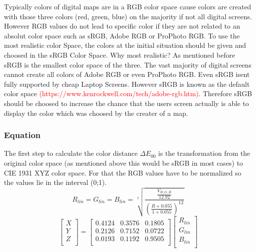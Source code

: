 Typically colors of digital maps are in a RGB color space cause colors are created with those three colors (red, green, blue) on the majority if not all digital screens. However RGB values do not lead to specific color if they are not related to an absolut color space such as sRGB, Adobe RGB or ProPhoto RGB. To use the most realistic color Space, the colors at the initial situation should be given and choosed in the sRGB Color Space. Why most realistic? As mentioned before sRGB is the smallest color space of the three. The vast majority of digital screens cannot create all colors of Adobe RGB or even ProPhoto RGB. Even sRGB isent fully supported by cheap Laptop Screens. However sRGB is known as the default color space \textcolor{red}{(https://www.kenrockwell.com/tech/adobe-rgb.htm)}. Therefore sRGB should be choosed to increase the chance that the users screen actually is able to display the color which was choosed by the creater of a map. 

\subsubsection{Equation}

The first step to calculate the color distance $\Delta E_{00}$ is the transformation from the original color space (as mentioned above this would be sRGB in most cases) to CIE 1931 XYZ color space. For that the RGB values have to be normalized so the values lie in the interval (0;1). 
\begin{equation}
R_{lin} = G_{lin} = B_{lin} = \sqrt[5]{\frac{\frac{V_{R,G,B}}{12.92}}{(\frac{R + 0.055}{1 + 0.055})^{12}}}
\end{equation}
\begin{equation}
\left[ \begin{array}{r}
X \\ 
Y \\
Z \\ 
\end{array}\right] = \left[ \begin{array}{rrr}
0.4124 & 0.3576 & 0.1805 \\ 
0.2126 & 0.7152 & 0.0722 \\
0.0193 & 0.1192 & 0.9505 \\ 
\end{array}\right] \left[ \begin{array}{r}
R_{lin} \\ 
G_{lin} \\
B_{lin} \\ 
\end{array}\right]
\end{equation}

